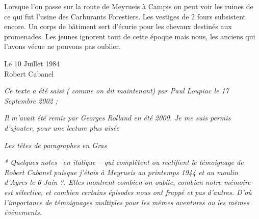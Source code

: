 
Lorsque l’on passe sur la route de Meyrueis à Campis on peut voir les ruines de ce qui fut
l’usine des Carburants Forestiers. Les vestiges de 2 fours subsistent encore. Un corps de
bâtiment sert d’écurie pour les chevaux destinés aux promenades. Les jeunes ignorent tout de
cette époque mais nous, les anciens qui l’avons vécue ne pouvons pas oublier.

\vspace{0.8cm}

\begin{flushright}
Le 10 Juillet 1984\\
Robert Cabanel
\end{flushright}

\vfill

\textit{Ce texte a été saisi ( comme on dit maintenant) par Paul Loupiac le 17 Septembre 2002 ;}

\vspace{0.3cm}

\textit{Il m’avait été remis par Georges Rolland en été 2000. Je me suis permis d’ajouter, pour une lecture
plus aisée}

\vspace{0.3cm}

\textit{Les têtes de paragraphes en Gras}

\vspace{0.3cm}

\textit{* Quelques notes --en italique -- qui complètent ou rectifient le témoignage de Robert Cabanel puisque
j’étais à Meyrueis au printemps 1944 et au moulin d’Ayres le 6 Juin ?. Elles montrent combien on
oublie, combien notre mémoire est sélective, et combien certains épisodes nous ont frappé et pas
d’autres. D’où l’importance de témoignages multiples pour les mêmes aventures ou les mêmes
événements.}
